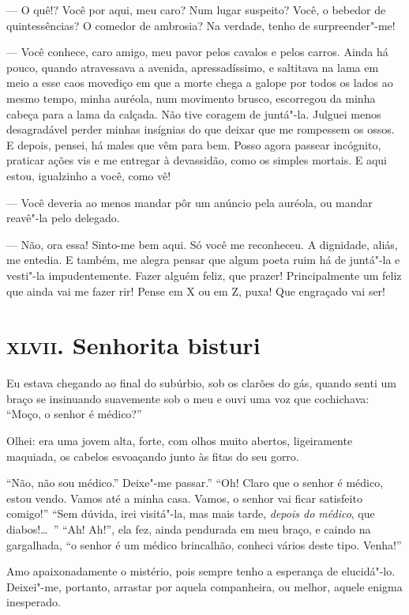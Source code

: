 --- O quê!? Você por aqui, meu caro? Num lugar suspeito?
Você, o bebedor de quintessências? O comedor de ambrosia? Na
verdade, tenho de surpreender"-me!

--- Você conhece, caro amigo, meu pavor pelos cavalos e pelos carros. Ainda
há pouco, quando atravessava a avenida, apressadíssimo, e
saltitava na lama em meio a esse caos movediço em que a morte chega a
galope por todos os lados ao mesmo tempo, minha auréola, num movimento
brusco, escorregou da minha cabeça para a lama da calçada. Não tive
coragem de juntá"-la. Julguei menos desagradável perder minhas
insígnias do que deixar que me rompessem os ossos. E depois, pensei, há
males que vêm para bem. Posso agora passear incógnito, praticar ações
vis e me entregar à devassidão, como os simples mortais. E 
aqui estou, igualzinho a você, como vê!

--- Você deveria ao menos mandar pôr um anúncio pela auréola, ou mandar
reavê"-la pelo delegado.

--- Não, ora essa! Sinto-me bem aqui. Só você me reconheceu. A dignidade, aliás, me entedia. E também, me alegra pensar que algum poeta ruim
há de juntá"-la e vesti"-la impudentemente. Fazer alguém feliz, que
prazer! Principalmente um feliz que ainda vai me fazer rir! Pense em X ou em
Z, puxa! Que engraçado vai ser!

\chapter{\textsc{xlvii.} Senhorita bisturi}

Eu estava chegando ao final do subúrbio, sob os clarões do gás,
quando senti um braço se insinuando suavemente sob o meu e ouvi uma
voz que cochichava: “Moço, o senhor é
médico?''

Olhei: era uma jovem alta, forte, com olhos muito abertos, ligeiramente
maquiada, os cabelos esvoaçando junto às fitas do seu gorro.

“Não, não sou médico.'' Deixe"-me passar.'' “Oh! Claro que
o senhor é médico, estou vendo. Vamos até a minha casa. Vamos, o senhor vai ficar
satisfeito comigo!'' “Sem dúvida, irei visitá"-la, mas mais
tarde, \textit{depois do médico}, que diabos!\ldots\ '' “Ah! Ah!'', ela fez, ainda
pendurada em meu braço, e caindo na gargalhada, “o senhor é um médico
brincalhão, conheci vários deste tipo. Venha!''

Amo apaixonadamente o mistério, pois sempre tenho a esperança de
elucidá"-lo. Deixei"-me, portanto, arrastar por aquela companheira,
ou melhor, aquele enigma inesperado.

